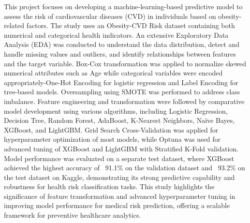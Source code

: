 

This project focuses on developing a machine-learning-based predictive model to assess the risk of cardiovascular diseases (CVD) in individuals based on obesity-related factors.
The study uses an Obesity-CVD Risk dataset containing both numerical and categorical health indicators.
An extensive Exploratory Data Analysis (EDA) was conducted to understand the data distribution, detect and handle missing values and outliers, and identify relationships between features and the target variable.
Box-Cox transformation was applied to normalize skewed numerical attributes such as Age while categorical variables were encoded appropriately-One-Hot Encoding for logistic regression and Label Encoding for tree-based models.
Oversampling using SMOTE was performed to address class imbalance.
Feature engineering and transformation were followed by comparative model development using various algorithms, including Logistic Regression, Decision Tree, Random Forest, AdaBoost, K-Nearest Neighbors, Na\"ive Bayes, XGBoost, and LightGBM. Grid Search Cross-Validation was applied for hyperparameter optimization of most models, while Optuna was used for advanced tuning of XGBoost and LightGBM with Stratified K-Fold validation.
Model performance was evaluated on a separate test dataset, where XGBoost achieved the highest accuracy of ~91.1\% on the validation dataset and ~93.2\% on the test dataset on Kaggle, demonstrating its strong predictive capability and robustness for health risk classification tasks.
This study highlights the significance of feature transformation and advanced hyperparameter tuning in improving model performance for medical risk prediction, offering a scalable framework for preventive healthcare analytics.
